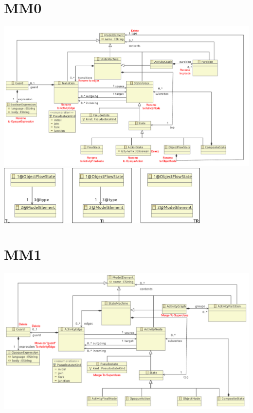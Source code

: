 \documentclass[a4paper,10pt]{article}
\title{}
\author{}
\begin{document}
\centering
\section{MM0}

\includegraphics[width=\textwidth]{0/original_minimal_metamodel_0}\\

\includegraphics[width=0.8\textwidth]{0/mm0_delete}

\section{MM1}
\includegraphics[width=\textwidth]{1/original_minimal_metamodel_1}
\end{document}
